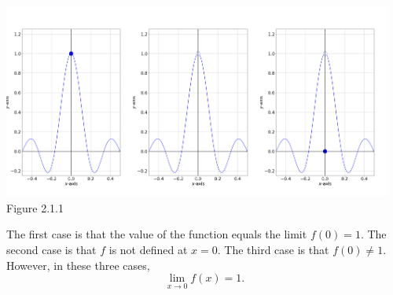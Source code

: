 \documentclass[11pt]{book}
\theoremstyle{break}
\theoremstyle{no_label}
\newcommand{\figtag}[1]{\\[-1.2em]Figure {#1}}
\numberwithin{equation}{section}
\begin{document}
\begin{center}
    \includegraphics[width=0.32\textwidth]{defined_or_not_1.png}\includegraphics[width=0.32\textwidth]{defined_or_not_2.png}\includegraphics[width=0.32\textwidth]{defined_or_not_3.png}\figtag{2.1.1}
\end{center}

The first case is that the value of the function equals the limit $f(0)=1$. The second case is that $f$ is not defined at $x=0$. The third case is that $f(0)\ne 1$. However, in these three cases, $$\lim_{x\to 0}f(x)=1.$$
\end{document}
